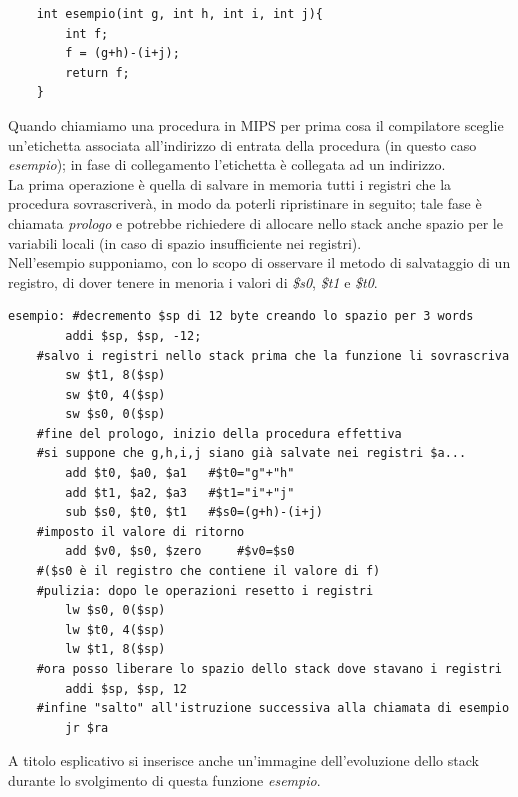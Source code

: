 \documentclass[class=book, crop=false]{standalone}
\begin{document}
\begin{verbatim}
	int esempio(int g, int h, int i, int j){
		int f;
		f = (g+h)-(i+j);
		return f;
	}
\end{verbatim}

Quando chiamiamo una procedura in MIPS per prima cosa il compilatore sceglie un’etichetta associata all’indirizzo di entrata della procedura (in questo caso \emph{esempio}); in fase di collegamento l'etichetta è collegata ad un indirizzo.\\
La prima operazione è quella di salvare in memoria tutti i registri che la procedura sovrascriverà, in modo da poterli ripristinare in seguito; tale fase è chiamata \emph{prologo} e potrebbe richiedere di allocare nello stack anche spazio per le variabili locali (in caso di spazio insufficiente nei registri).\\
Nell'esempio supponiamo, con lo scopo di osservare il metodo di salvataggio di un registro, di dover tenere in menoria i valori di \emph{\$s0}, \emph{\$t1} e \emph{\$t0}.\\

\begin{verbatim}
esempio: #decremento $sp di 12 byte creando lo spazio per 3 words
		addi $sp, $sp, -12;
	#salvo i registri nello stack prima che la funzione li sovrascriva
		sw $t1, 8($sp)
		sw $t0, 4($sp)
		sw $s0, 0($sp)
	#fine del prologo, inizio della procedura effettiva
	#si suppone che g,h,i,j siano già salvate nei registri $a...
		add $t0, $a0, $a1	#$t0="g"+"h"
		add $t1, $a2, $a3	#$t1="i"+"j"
		sub $s0, $t0, $t1	#$s0=(g+h)-(i+j)
	#imposto il valore di ritorno
		add $v0, $s0, $zero 	#$v0=$s0
	#($s0 è il registro che contiene il valore di f)
	#pulizia: dopo le operazioni resetto i registri
		lw $s0, 0($sp)
		lw $t0, 4($sp)
		lw $t1, 8($sp)
	#ora posso liberare lo spazio dello stack dove stavano i registri
		addi $sp, $sp, 12
	#infine "salto" all'istruzione successiva alla chiamata di esempio
		jr $ra
\end{verbatim}

A titolo esplicativo si inserisce anche un'immagine dell'evoluzione dello stack durante lo svolgimento di questa funzione \emph{esempio}.
\end{document}
